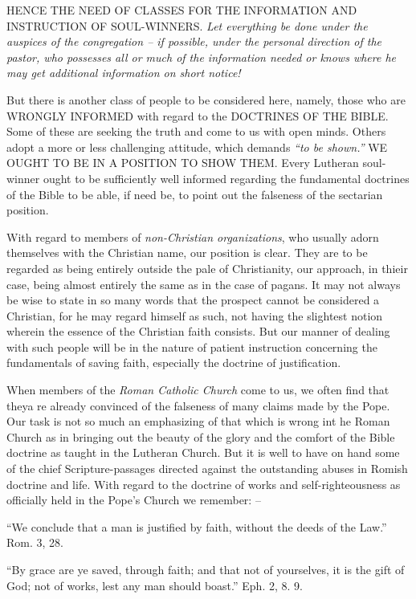 \documentclass[
]{book}
\begin{document}
HENCE THE NEED OF CLASSES FOR THE INFORMATION AND INSTRUCTION OF SOUL-WINNERS. \emph{Let everything be done under the auspices of the congregation -- if possible, under the personal direction of the pastor, who possesses all or much of the information needed or knows where he may get additional information on short notice!}

But there is another class of people to be considered here, namely, those who are WRONGLY INFORMED with regard to the DOCTRINES OF THE BIBLE. Some of these are seeking the truth and come to us with open minds. Others adopt a more or less challenging attitude, which demands \emph{``to be shown.''} WE OUGHT TO BE IN A POSITION TO SHOW THEM. Every Lutheran soul-winner ought to be sufficiently well informed regarding the fundamental doctrines of the Bible to be able, if need be, to point out the falseness of the sectarian position.

With regard to members of \emph{non-Christian organizations}, who usually adorn themselves with the Christian name, our position is clear. They are to be regarded as being entirely outside the pale of Christianity, our approach, in thieir case, being almost entirely the same as in the case of pagans. It may not always be wise to state in so many words that the prospect cannot be considered a Christian, for he may regard himself as such, not having the slightest notion wherein the essence of the Christian faith consists. But our manner of dealing with such people will be in the nature of patient instruction concerning the fundamentals of saving faith, especially the doctrine of justification.

When members of the \emph{Roman Catholic Church} come to us, we often find that theya re already convinced of the falseness of many claims made by the Pope. Our task is not so much an emphasizing of that which is wrong int he Roman Church as in bringing out the beauty of the glory and the comfort of the Bible doctrine as taught in the Lutheran Church. But it is well to have on hand some of the chief Scripture-passages directed against the outstanding abuses in Romish doctrine and life. With regard to the doctrine of works and self-righteousness as officially held in the Pope's Church we remember: --

``We conclude that a man is justified by faith, without the deeds of the Law.'' Rom. 3, 28.

``By grace are ye saved, through faith; and that not of yourselves, it is the gift of God; not of works, lest any man should boast.'' Eph. 2, 8. 9.
\end{document}
